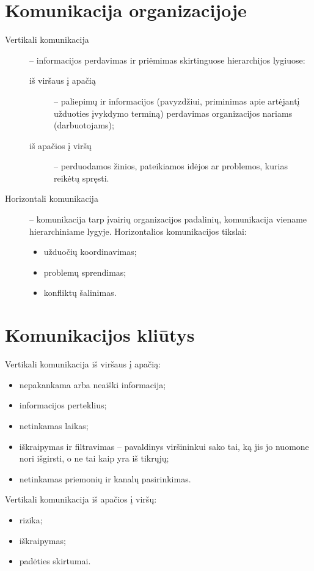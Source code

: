\section{Komunikacija organizacijoje}

\begin{description}
  \item[Vertikali komunikacija] – informacijos perdavimas ir priėmimas
    skirtinguose hierarchijos lygiuose:
    \begin{description}
      \item[iš viršaus į apačią] – paliepimų ir informacijos
        (pavyzdžiui, priminimas apie artėjantį užduoties įvykdymo
        terminą) perdavimas organizacijos nariams (darbuotojams);
      \item[iš apačios į viršų] – perduodamos žinios, pateikiamos idėjos
        ar problemos, kurias reikėtų spręsti.
    \end{description}
  \item[Horizontali komunikacija] – komunikacija tarp įvairių organizacijos
    padalinių, komunikacija viename hierarchiniame lygyje. Horizontalios
    komunikacijos tikslai:
    \begin{itemize}
      \item užduočių koordinavimas;
      \item problemų sprendimas;
      \item konfliktų šalinimas.
    \end{itemize}
\end{description}

\section{Komunikacijos kliūtys}

Vertikali komunikacija iš viršaus į apačią:
\begin{itemize}
  \item nepakankama arba neaiški informacija;
  \item informacijos perteklius;
  \item netinkamas laikas;
  \item iškraipymas ir filtravimas – pavaldinys viršininkui sako tai,
    ką jis jo nuomone nori išgirsti, o ne tai kaip yra iš tikrųjų;
  \item netinkamas priemonių ir kanalų pasirinkimas.
\end{itemize}

Vertikali komunikacija iš apačios į viršų:
\begin{itemize}
  \item rizika;
  \item iškraipymas;
  \item padėties skirtumai.
\end{itemize}

